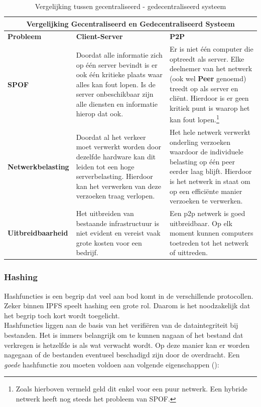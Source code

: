 \begin{table}[h!]
	\centering
	\begin{tabular}{ |p{3cm}|p{6cm}|p{6cm}|}
		\hline
		\multicolumn{3}{|c|}{Vergelijking Gecentraliseerd en Gedecentraliseerd Systeem}\\
		\hline
		\textbf{Probleem}&\textbf{Client-Server}&\textbf{P2P}\\
		\hline
		\textbf{SPOF}&Doordat alle informatie zich op één server bevindt is er ook één kritieke plaats waar alles kan fout lopen. Is de server onbeschikbaar zijn alle diensten en informatie hierop dat ook.& Er is niet één computer die optreedt als server. Elke deelnemer van het netwerk (ook wel \textbf{Peer} genoemd) treedt op als server en cliënt. Hierdoor is er geen kritiek punt is waarop het kan fout lopen.\footnote{Zoals hierboven vermeld geld dit enkel voor een puur netwerk. Een hybride netwerk heeft nog steeds het probleem van SPOF.}\\
		\hline
		\textbf{Netwerkbelasting}&Doordat al het verkeer moet verwerkt worden door dezelfde hardware kan dit leiden tot een hoge serverbelasting. Hierdoor kan het verwerken van deze verzoeken traag verlopen.&Het hele netwerk verwerkt onderling verzoeken waardoor de individuele belasting op één peer eerder laag blijft. Hierdoor is het netwerk in staat om op een efficiënte manier verzoeken te verwerken.\\
		\hline
		\textbf{Uitbreidbaarheid}&Het uitbreiden van bestaande infrastructuur is niet evident en vereist vaak grote kosten voor een bedrijf.&Een p2p netwerk is goed uitbreidbaar. Op elk moment kunnen computers toetreden tot het netwerk of uittreden.\\
		\hline
	\end{tabular}
	\label{tbl_concepts}
	\caption{Vergelijking tussen gecentraliseerd - gedecentraliseerd systeem}
\end{table}
\newpage
\subsubsection{Hashing}
\label{hashing}
Hashfuncties is een begrip dat veel aan bod komt in de verschillende protocollen.  Zeker binnen IPFS speelt hashing een grote rol. Daarom is het noodzakelijk dat het begrip toch kort wordt toegelicht.\\

Hashfuncties liggen aan de basis van het verifiëren van de dataintegriteit bij bestanden. Het is immers belangrijk om te kunnen nagaan of het bestand dat verkregen is hetzelfde is als wat verwacht wordt. Op deze manier kan er worden nagegaan of de bestanden eventueel beschadigd zijn door de overdracht. Een \textit{goede} hashfunctie zou moeten voldoen aan volgende eigenschappen (\autocite{Anderson93}):

